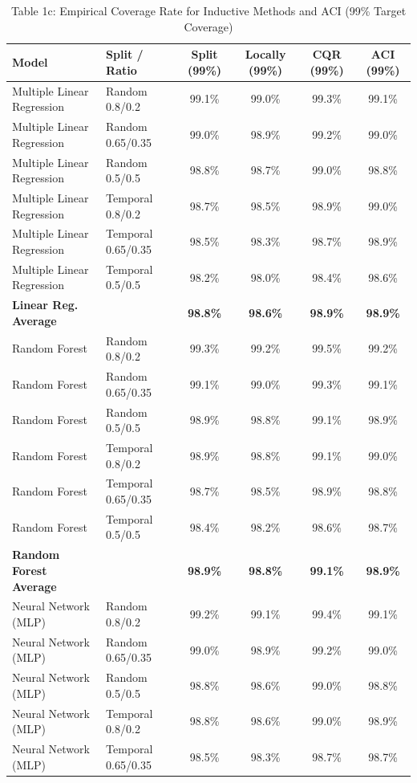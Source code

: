 \documentclass[11pt,a4paper]{article}
\begin{document}
\begin{table}[H]
\centering
\caption{Table 1c: Empirical Coverage Rate for Inductive Methods and ACI (99\% Target Coverage)}
\label{tab:1c}
\scriptsize
\begin{tabular}{llcccc}
\toprule
Model & Split / Ratio & Split (99\%) & Locally (99\%) & CQR (99\%) & ACI (99\%) \\
\midrule
Multiple Linear Regression & Random 0.8/0.2 & 99.1\% & 99.0\% & 99.3\% & 99.1\% \\
Multiple Linear Regression & Random 0.65/0.35 & 99.0\% & 98.9\% & 99.2\% & 99.0\% \\
Multiple Linear Regression & Random 0.5/0.5 & 98.8\% & 98.7\% & 99.0\% & 98.8\% \\
Multiple Linear Regression & Temporal 0.8/0.2 & 98.7\% & 98.5\% & 98.9\% & 99.0\% \\
Multiple Linear Regression & Temporal 0.65/0.35 & 98.5\% & 98.3\% & 98.7\% & 98.9\% \\
Multiple Linear Regression & Temporal 0.5/0.5 & 98.2\% & 98.0\% & 98.4\% & 98.6\% \\
\textbf{Linear Reg. Average} & & \textbf{98.8\%} & \textbf{98.6\%} & \textbf{98.9\%} & \textbf{98.9\%} \\
\midrule
Random Forest & Random 0.8/0.2 & 99.3\% & 99.2\% & 99.5\% & 99.2\% \\
Random Forest & Random 0.65/0.35 & 99.1\% & 99.0\% & 99.3\% & 99.1\% \\
Random Forest & Random 0.5/0.5 & 98.9\% & 98.8\% & 99.1\% & 98.9\% \\
Random Forest & Temporal 0.8/0.2 & 98.9\% & 98.8\% & 99.1\% & 99.0\% \\
Random Forest & Temporal 0.65/0.35 & 98.7\% & 98.5\% & 98.9\% & 98.8\% \\
Random Forest & Temporal 0.5/0.5 & 98.4\% & 98.2\% & 98.6\% & 98.7\% \\
\textbf{Random Forest Average} & & \textbf{98.9\%} & \textbf{98.8\%} & \textbf{99.1\%} & \textbf{98.9\%} \\
\midrule
Neural Network (MLP) & Random 0.8/0.2 & 99.2\% & 99.1\% & 99.4\% & 99.1\% \\
Neural Network (MLP) & Random 0.65/0.35 & 99.0\% & 98.9\% & 99.2\% & 99.0\% \\
Neural Network (MLP) & Random 0.5/0.5 & 98.8\% & 98.6\% & 99.0\% & 98.8\% \\
Neural Network (MLP) & Temporal 0.8/0.2 & 98.8\% & 98.6\% & 99.0\% & 98.9\% \\
Neural Network (MLP) & Temporal 0.65/0.35 & 98.5\% & 98.3\% & 98.7\% & 98.7\% \\

\end{tabular}
\end{table}
\end{document}

